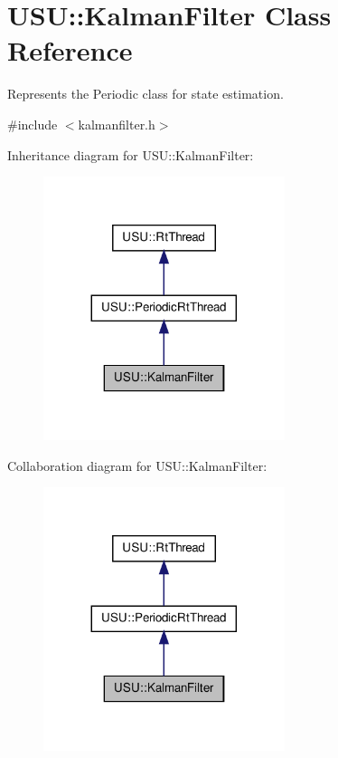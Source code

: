 \hypertarget{class_u_s_u_1_1_kalman_filter}{\section{\-U\-S\-U\-:\-:\-Kalman\-Filter \-Class \-Reference}
\label{class_u_s_u_1_1_kalman_filter}
}


\-Represents the \-Periodic class for state estimation.  




{\ttfamily \#include $<$kalmanfilter.\-h$>$}



\-Inheritance diagram for \-U\-S\-U\-:\-:\-Kalman\-Filter\-:
\nopagebreak
\begin{figure}[H]
\begin{center}
\leavevmode
\includegraphics[width=200pt]{class_u_s_u_1_1_kalman_filter__inherit__graph}
\end{center}
\end{figure}


\-Collaboration diagram for \-U\-S\-U\-:\-:\-Kalman\-Filter\-:
\nopagebreak
\begin{figure}[H]
\begin{center}
\leavevmode
\includegraphics[width=200pt]{class_u_s_u_1_1_kalman_filter__coll__graph}
\end{center}
\end{figure}
